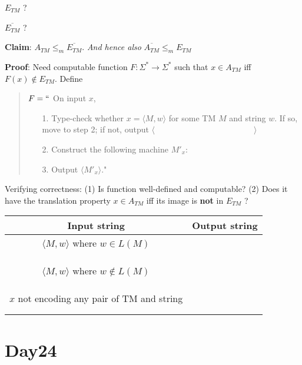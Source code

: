 \documentclass[12pt, oneside]{article}
\begin{document}
$E_{TM}$  ? 

$\overline{E_{TM}}$ ? 

\vfill


{\bf Claim}: $A_{TM}  \leq_m \overline{E_{TM}}$. {\it And hence also } $\overline{A_{TM}} \leq_m E_{TM}$

{\bf Proof}: Need computable function  $F: \Sigma^* \to \Sigma^*$  such that  $x \in A_{TM}$ iff $F(x)  \notin  E_{TM}$.
Define

\vspace{-15pt}

\begin{quote}
$F =  ``$ On input $x$,
\begin{itemize}
\item[1.] Type-check whether  $x = \langle M, w \rangle$ for some TM $M$ and string $w$. 
If so, move to step 2; if  not, output  $\langle \hspace{2in} \rangle$
\item[2.] Construct the following machine $M'_x$:
\vspace{50pt}
\item[3.] Output $\langle M'_x \rangle$."
\end{itemize}
\end{quote}

Verifying correctness: (1) Is function well-defined and computable? (2) Does it have the 
translation property $x \in A_{TM}$ iff its image is {\bf not} in $E_{TM}$ ? 
\begin{center}
\begin{tabular}{|c|c|}
\hline
Input string &  Output string \\
\hline
$\langle M, w \rangle$ where  $w \in L(M)$ & \phantom{\hspace{4in}} \\
& \\
& \\
& \\
$\langle M, w \rangle$ where $w \notin L(M)$ & \\
& \\
&\\ & \\
$x$ not encoding any pair of  TM and string   &  \\
& \\
& \\
\hline
\end{tabular}
\end{center}

\vfill \vfill
\section*{Day24}
\end{document}
